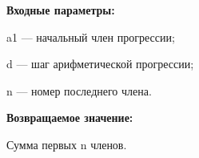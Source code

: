 \textbf{Входные параметры:}  
 
 a1 --- начальный член прогрессии;
 
 d --- шаг арифметической прогрессии;
 
 n --- номер последнего члена.

\textbf{Возвращаемое значение:}
 
Сумма первых n членов.